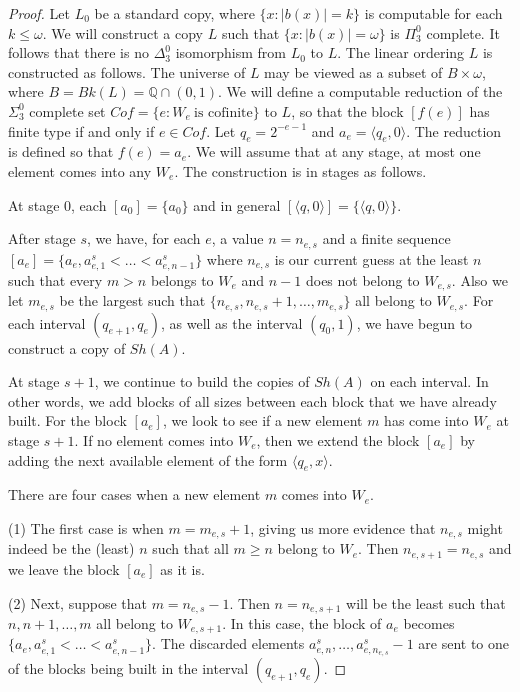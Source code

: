 \documentclass[11pt]{amsart}
\theoremstyle{definition}
\def\bQ{{\mathbb Q}}
\def\bQ{{\mathbb Q}}
\def\la{\langle}
\def\ra{\rangle}
\begin{document}
\begin{proof}  Let $L_0$ be a standard copy, where $\{x: |b(x)| = k\}$ is computable for each $k \leq \omega$. We will construct a copy $L$
such that  $\{x: |b(x)| = \omega\}$ is $\Pi^0_3$ complete. It follows that there is no $\Delta^0_3$ isomorphism from $L_0$ to $L$. The linear ordering $L$ is constructed as follows. The universe of $L$ may be viewed as a subset of $B \times \omega$,
where $B = Bk(L) = \bQ \cap (0,1)$.  We will define a computable reduction of the $\Sigma^0_3$ complete set $Cof = \{e: W_e\ \text{is cofinite}\}$ to $L$, so that 
the block $[f(e)]$ has finite type if and only if $e \in Cof$. 
Let $q_e = 2^{-e-1}$ and $a_e = \la q_e,0 \ra$. The reduction is defined so that $f(e) = a_e$. We will assume that at any stage, at most one element comes into any $W_e$. The construction is in stages as follows. 

At stage 0, each $[a_0] = \{a_0\}$ and in general $[\la q,0\ra] = \{\la q,0\ra\}$.

After stage $s$, we have, for each $e$, a value $n = n_{e,s}$ and a finite sequence $[a_e] = \{a_e, a^s_{e,1} < \dots < a^s_{e,n-1}\}$ where $n_{e,s}$ is our current guess at the least $n$ such that every $m>n$ belongs to $W_e$ and 
$n -1$ does not belong to $W_{e,s}$. Also we let $m_{e,s}$ be the largest such that $\{n_{e,s},n_{e,s}+1,\dots,m_{e,s}\}$ all belong to $W_{e,s}$.  For each interval $(q_{e+1},q_e)$, as well as the interval $(q_0,1)$, we have begun to construct a copy of $Sh(A)$. 

At stage $s+1$, we continue to build the copies of $Sh(A)$ on each interval. 
In other words, we add blocks of all sizes between each block that we have already built.
For the block $[a_e]$, we look to see if a new element $m$ has come into $W_e$ at stage $s+1$. If no element comes into $W_e$, then we extend the block $[a_e]$ by adding the next available element of the form $\la q_e, x \ra$.

There are four cases when a new element $m$ comes into $W_e$. 

(1) The first case is when $m = m_{e,s}+1$, giving us more evidence that $n_{e,s}$ might indeed be the (least) $n$ such that all $m \geq n$ belong to $W_e$. Then $n_{e,s+1} = n_{e,s}$ and we leave the block $[a_e]$ as it is. 

\medskip

(2) Next, suppose that $m = n_{e,s} - 1$. Then $n = n_{e,s+1}$ will be the least such that $n,n+1,\dots,m$ all belong to $W_{e,s+1}$. In this case, the block of $a_e$ becomes $\{a_e, a^s_{e,1} < \dots < a^s_{e,n-1}\}$. The discarded elements $a^s_{e,n}, \dots, a^s_{e,n_{e,s}}-1$ are sent to one of the blocks being built in the interval $(q_{e+1},q_e)$. 


\end{proof}
\end{document}
